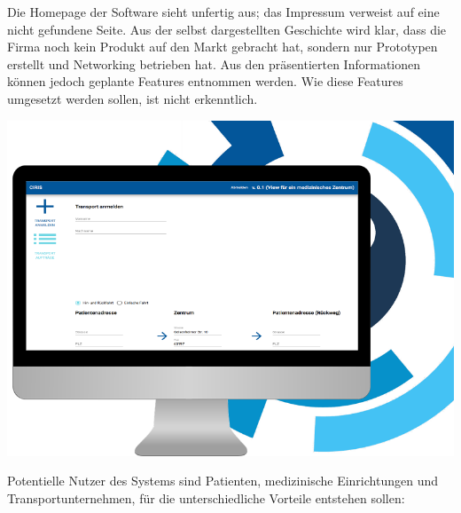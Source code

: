 \documentclass[a4paper, ngerman, 12pt]{scrartcl}
\begin{document}
Die Homepage der Software sieht unfertig aus; das Impressum verweist auf eine nicht gefundene Seite. Aus der selbst dargestellten Geschichte wird klar, dass die Firma noch kein Produkt auf den Markt gebracht hat, sondern nur Prototypen erstellt und Networking betrieben hat. Aus den präsentierten Informationen können jedoch geplante Features entnommen werden. Wie diese Features umgesetzt werden sollen, ist nicht erkenntlich.\\
\begin{center}
\begin{minipage}{0.8\textwidth}
	\centering
	\includegraphics[width=\textwidth]{Bilder/ciris.png}
	\label{img:ciris}
\end{minipage}
\end{center}
Potentielle Nutzer des Systems sind Patienten, medizinische Einrichtungen und Transportunternehmen, für die unterschiedliche Vorteile entstehen sollen:
\end{document}
